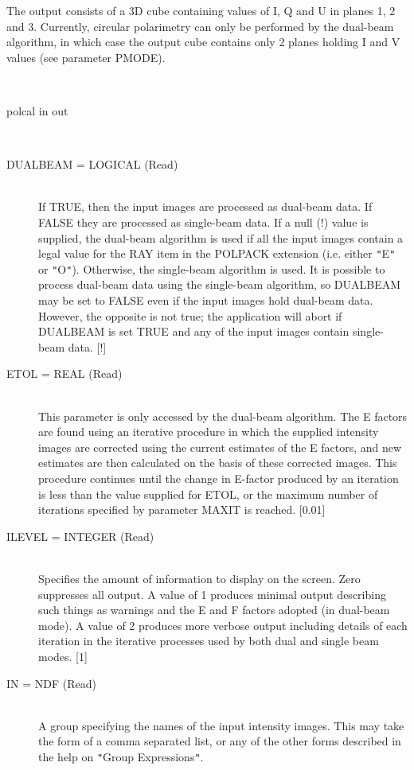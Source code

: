 \documentclass[twoside,11pt]{article}
\renewcommand{\_}{\texttt{\symbol{95}}}
\newcommand{\sstusage}[1]{\item[Usage:] \mbox{}
\\[1.3ex]{\raggedright \ssttt #1}}
\newcommand{\sstparameters}[1]{
   \item[Parameters:] \mbox{} \\
   \vspace{-3.5ex}
   \begin{description}
      #1
   \end{description}
}
\newcommand{\sstsubsection}[1]{ \item[{#1}] \mbox{} \\}
\newcommand{\sstusage}[1]{\item[Usage:]
      \begin{description}
         {\ssttt #1}
      \end{description}
      \\
   }
\newcommand{\sstparameters}[1]{
      \item[Parameters:] \\
      \begin{description}
         #1
      \end{description}
      \\
   }
\newcommand{\sstsubsection}[1]{\item[{#1}]}
\begin{document}
{{      The output consists of a 3D cube containing values of I, Q and U
      in planes 1, 2 and 3. Currently, circular polarimetry can only be
      performed by the dual-beam algorithm, in which case the output cube
      contains only 2 planes holding I and V values (see parameter PMODE).
   }
   \sstusage{
      polcal in out
   }
   \sstparameters{
      \sstsubsection{
         DUALBEAM = \_LOGICAL (Read)
      }{
         If TRUE, then the input images are processed as dual-beam data.
         If FALSE they are processed as single-beam data. If a null (!)
         value is supplied, the dual-beam algorithm is used if all the input
         images contain a legal value for the RAY item in the POLPACK
         extension (i.e. either {\tt "}E{\tt "} or {\tt "}O{\tt "}). Otherwise, the single-beam
         algorithm is used. It is possible to process dual-beam data using
         the single-beam algorithm, so DUALBEAM may be set to FALSE even
         if the input images hold dual-beam data. However, the opposite
         is not true; the application will abort if DUALBEAM is set TRUE and
         any of the input images contain single-beam data. [!]
      }
      \sstsubsection{
         ETOL = \_REAL (Read)
      }{
         This parameter is only accessed by the dual-beam algorithm. The E
         factors are found using an iterative procedure in which the supplied
         intensity images are corrected using the current estimates of the E
         factors, and new estimates are then calculated on the basis of these
         corrected images. This procedure continues until the change in
         E-factor produced by an iteration is less than the value supplied
         for ETOL, or the maximum number of iterations specified by parameter
         MAXIT is reached. [0.01]
      }
      \sstsubsection{
         ILEVEL = \_INTEGER (Read)
      }{
         Specifies the amount of information to display on the screen.
         Zero suppresses all output. A value of 1 produces minimal output
         describing such things as warnings and the E and F factors
         adopted (in dual-beam mode). A value of 2 produces more verbose
         output including details of each iteration in the iterative
         processes used by both dual and single beam modes. [1]
      }
      \sstsubsection{
         IN = NDF (Read)
      }{
         A group specifying the names of the input intensity images. This
         may take the form of a comma separated list, or any of the other
         forms described in the help on {\tt "}Group Expressions{\tt "}.
      }
      \sstsubsection{
}}}
\end{document}
